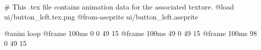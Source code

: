 # This .tex file contains animation data for the associated texture.
@load ui/button_left.tex.png
@from-aseprite ui/button_left.aseprite

@anim loop
	@frame 100ms 0 0 49 15
	@frame 100ms 49 0 49 15
	@frame 100ms 98 0 49 15
